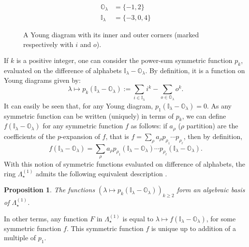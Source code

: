 \documentclass[11pt]{amsart}
\theoremstyle{plain}
\newtheorem{proposition}[lemma]{Proposition}
\theoremstyle{remark}
\newcommand{\II}{\mathbb{I}}
\newcommand{\OO}{\mathbb{O}}
\newcommand{\Polun}{\Lambda_\star^{(1)}}
\begin{document}
\begin{figure}[tb]
    \begin{minipage}{.6 \linewidth}
    \begin{flushright}
    \end{flushright}
\end{minipage} \hfill
\begin{minipage}{.35\linewidth}
    \begin{align*}
        \OO_\lambda&=\{-1,2\} \\
        \II_\lambda&=\{-3,0,4\}
    \end{align*}
\end{minipage}
    \caption{A Young diagram with its inner and outer corners (marked respectively with $i$ and $o$).}
    \label{FigCorners}
\end{figure}
If $k$ is a positive integer, one can consider the power-sum symmetric function
$p_k$, evaluated on the difference of alphabets $\II_\lambda - \OO_\lambda$.
By definition, it is a function on Young diagrams given by:
\[\lambda \mapsto p_k(\II_\lambda - \OO_\lambda):= \sum_{i \in \II_\lambda} i^k - 
\sum_{o \in \OO_\lambda} o^k.\]
It can easily be seen that, for any Young diagram, $p_1(\II_\lambda - \OO_\lambda)=0$.
As any symmetric function can be written (uniquely) in terms of $p_k$,
we can define $f(\II_\lambda - \OO_\lambda)$ for any symmetric function $f$ as
follows:
if $a_\rho$ ($\rho$ partition) are the coefficients of the $p$-expansion of $f$,
that is $f=\sum_\rho a_\rho p_{\rho_1} \cdots p_{\rho_\ell}$, then by definition,
\[f(\II_\lambda - \OO_\lambda)=\sum_\rho a_\rho p_{\rho_1}(\II_\lambda - \OO_\lambda)
\cdots p_{\rho_\ell} (\II_\lambda - \OO_\lambda).\]
With this notion of symmetric functions evaluated on difference of alphabets,
the ring $\Polun$ admits the following equivalent description
\cite[Corollary 2.8]{IvanovOlshanski2002}.
\begin{proposition}\label{prop:pk_basis}
    The functions 
    $(\lambda \mapsto p_k(\II_\lambda - \OO_\lambda))_{k \geq 2}$
    form an algebraic basis of $\Polun$.
\end{proposition}
In other terms, any function $F$ in $\Polun$
is equal to $\lambda \mapsto f(\II_\lambda - \OO_\lambda)$,
for some symmetric function $f$.
This symmetric function $f$ is unique up to addition of a multiple of $p_1$.
\end{document}
